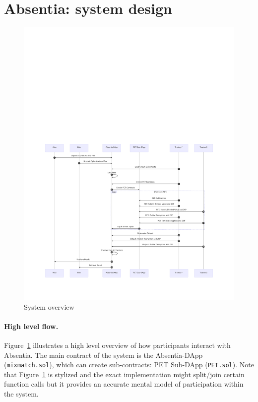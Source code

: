 
\section{Absentia: system design}
\label{sec:system}

\begin{figure}[t]
	\includegraphics[width=1\textwidth]{figures/absentia.pdf}
	\caption{System overview}
	\centering
	\label{fig:system}
\end{figure}


\paragraph{High level flow.} 
Figure~\ref{fig:system} illustrates a high level overview of how participants interact with Absentia. The main contract of the system is the Absentia-DApp (\texttt{mixmatch.sol}), which can create sub-contracts: PET Sub-DApp (\texttt{PET.sol}). Note that Figure~\ref{fig:system} is stylized and the exact implementation might split/join certain function calls but it provides an accurate mental model of participation within the system.

